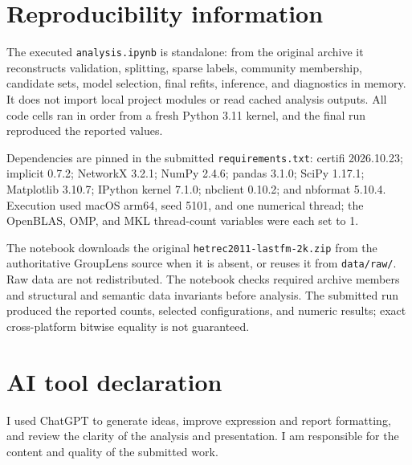 \documentclass[10pt,a4paper]{article}
\newcommand{\code}[1]{\texttt{#1}}
\begin{document}
\section{Reproducibility information}

The executed \code{analysis.ipynb} is standalone: from the original archive it reconstructs validation, splitting, sparse labels, community membership, candidate sets, model selection, final refits, inference, and diagnostics in memory. It does not import local project modules or read cached analysis outputs. All code cells ran in order from a fresh Python 3.11 kernel, and the final run reproduced the reported values.

Dependencies are pinned in the submitted \code{requirements.txt}: certifi 2026.10.23; implicit 0.7.2; NetworkX 3.2.1; NumPy 2.4.6; pandas 3.1.0; SciPy 1.17.1; Matplotlib 3.10.7; IPython kernel 7.1.0; nbclient 0.10.2; and nbformat 5.10.4. Execution used macOS arm64, seed 5101, and one numerical thread; the OpenBLAS, OMP, and MKL thread-count variables were each set to 1.

The notebook downloads the original \code{hetrec2011-lastfm-2k.zip} from the authoritative GroupLens source when it is absent, or reuses it from \code{data/raw/}. Raw data are not redistributed. The notebook checks required archive members and structural and semantic data invariants before analysis. The submitted run produced the reported counts, selected configurations, and numeric results; exact cross-platform bitwise equality is not guaranteed.

\section*{AI tool declaration}
I used ChatGPT to generate ideas, improve expression and report formatting, and review the clarity of the analysis and presentation. I am responsible for the content and quality of the submitted work.
\end{document}
